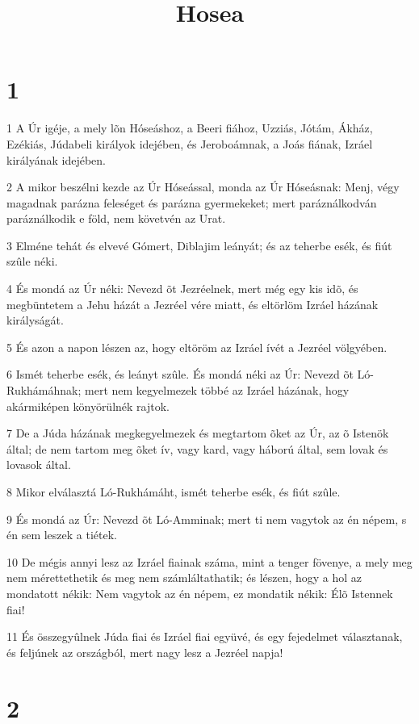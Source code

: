

\title{Hosea}


\chapter{1}

\par 1 A Úr igéje, a mely lõn Hóseáshoz, a Beeri fiához, Uzziás, Jótám, Ákház, Ezékiás, Júdabeli királyok idejében, és Jeroboámnak, a Joás fiának, Izráel királyának idejében.
\par 2 A mikor beszélni kezde az Úr Hóseással, monda az Úr Hóseásnak: Menj, végy magadnak parázna feleséget és parázna gyermekeket; mert paráználkodván paráználkodik e föld, nem követvén az Urat.
\par 3 Elméne tehát és elvevé Gómert, Diblajim leányát; és az teherbe esék, és fiút szûle néki.
\par 4 És mondá az Úr néki: Nevezd õt Jezréelnek, mert még egy kis idõ, és megbüntetem a Jehu házát a Jezréel vére miatt, és eltörlöm Izráel házának királyságát.
\par 5 És azon a napon lészen az, hogy eltöröm az Izráel ívét a Jezréel völgyében.
\par 6 Ismét teherbe esék, és leányt szûle. És mondá néki az Úr: Nevezd õt Ló-Rukhámáhnak; mert nem kegyelmezek többé az Izráel házának, hogy akármiképen könyörülnék rajtok.
\par 7 De a Júda házának megkegyelmezek és megtartom õket az Úr, az õ Istenök által; de nem tartom meg õket ív, vagy kard, vagy háború által, sem lovak és lovasok által.
\par 8 Mikor elválasztá Ló-Rukhámáht, ismét teherbe esék, és fiút szûle.
\par 9 És mondá az Úr: Nevezd õt Ló-Amminak; mert ti nem vagytok az én népem, s én sem leszek a tiétek.
\par 10 De mégis annyi lesz az Izráel fiainak száma, mint a tenger fövenye, a mely meg nem mérettethetik és meg nem számláltathatik; és lészen, hogy a hol az mondatott nékik: Nem vagytok az én népem, ez mondatik nékik: Élõ Istennek fiai!
\par 11 És összegyûlnek Júda fiai és Izráel fiai együvé, és egy fejedelmet választanak, és feljúnek az országból, mert nagy lesz a Jezréel napja!

\chapter{2}

